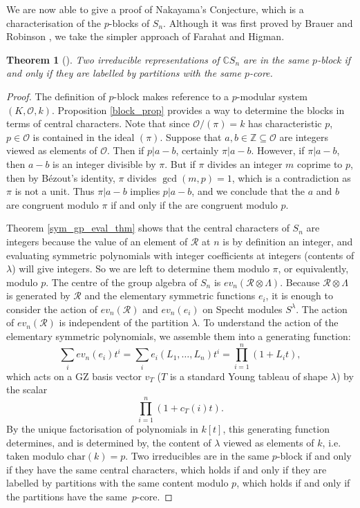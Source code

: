 \documentclass[10pt]{article}
\newtheorem{theorem}{Theorem}[section]
\theoremstyle{definition}
\begin{document}
We are now able to give a proof of Nakayama's Conjecture, which is a characterisation of the $p$-blocks of $S_n$. Although it was first proved by Brauer and Robinson \cite{BrauerRobinson}, we take the simpler approach of Farahat and Higman.
\begin{theorem}[{\cite{FarahatHigman}}] \label{nakayama_conjecture}
Two irreducible representations of $\mathbb{C}S_n$ are in the same $p$-block if and only if they are labelled by partitions with the same $p$-core.
\end{theorem}
\begin{proof}
The definition of $p$-block makes reference to a $p$-modular system $(K, \mathcal{O}, k)$. Proposition \ref{block_prop} provides a way to determine the blocks in terms of central characters. Note that since $\mathcal{O}/(\pi) = k$ has characteristic $p$, $p \in \mathcal{O}$ is contained in the ideal $(\pi)$. Suppose that $a, b \in \mathbb{Z} \subseteq \mathcal{O}$ are integers viewed as elements of $\mathcal{O}$. Then if $p | a-b$, certainly $\pi | a-b$. However, if $\pi | a-b$, then $a-b$ is an integer divisible by $\pi$. But if $\pi$ divides an integer $m$ coprime to $p$, then by B\'{e}zout's identity, $\pi$ divides $\gcd(m,p)=1$, which is a contradiction as $\pi$ is not a unit. Thus $\pi | a-b$ implies $p | a-b$, and we conclude that the $a$ and $b$ are congruent modulo $\pi$ if and only if the are congruent modulo $p$.

Theorem \ref{sym_gp_eval_thm} shows that the central characters of $S_n$ are integers because the value of an element of $\mathcal{R}$ at $n$ is by definition an integer, and evaluating symmetric polynomials with integer coefficients at integers (contents of $\lambda$) will give integers. So we are left to determine them modulo $\pi$, or equivalently, modulo $p$. The centre of the group algebra of $S_n$ is $ev_n(\mathcal{R} \otimes \Lambda)$. Because $\mathcal{R} \otimes \Lambda$ is generated by $\mathcal{R}$ and the elementary symmetric functions $e_i$, it is enough to consider the action of $ev_n(\mathcal{R})$ and $ev_n(e_i)$ on Specht modules $S^\lambda$. The action of $ev_n(\mathcal{R})$ is independent of the partition $\lambda$. To understand the action of the elementary symmetric polynomials, we assemble them into a generating function:
\[
\sum_i ev_n(e_i) t^i = 
\sum_i e_i(L_1, \ldots, L_n)t^i = \prod_{i=1}^n (1 + L_i t),
\]
which acts on a GZ basis vector $v_T$ ($T$ is a standard Young tableau of shape $\lambda$) by the scalar
\[
\prod_{i=1}^n (1 + c_T(i) t).
\]
By the unique factorisation of polynomials in $k[t]$, this generating function determines, and is determined by, the content of $\lambda$ viewed as elements of $k$, i.e. taken modulo $\mathrm{char}(k)=p$. Two irreducibles are in the same $p$-block if and only if they have the same central characters, which holds if and only if they are labelled by partitions with the same content modulo $p$, which holds if and only if the partitions have the same~$p$-core. 
\end{proof}
\end{document}

